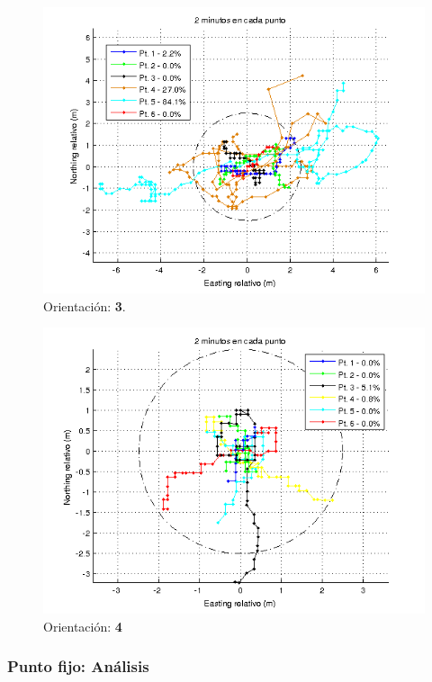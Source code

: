 \documentclass[spanish,12pt,a4paper,titlepage]{report}
\begin{document}
\newpage
\begin{figure}[h!]
  \includegraphics[width=1\textwidth]{./img/or2_todos_cut.png}
  \caption{Orientación: \textbf{3}.}
\vspace{-30pt}
  \label{fig:or2_todos_cut.png}
\end{figure}

\begin{figure}[h!]
  \includegraphics[width=.9\textwidth]{./img/or3_todos.png}
  \caption{Orientación: \textbf{4}}
  \label{fig:or3_todos.png}
\end{figure}

\newpage
\subsubsection{Punto fijo: Análisis}
\label{sec:gps2-punto-fijo-conclusiones}
\end{document}

